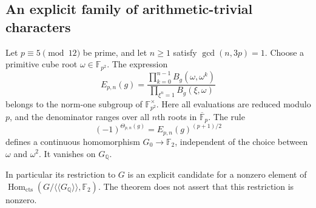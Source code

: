\subsection{An explicit family of arithmetic-trivial characters}

\begin{theorem}\label{thm:odd-anderson-character}
Let $p\equiv5\pmod{12}$ be prime, and let $n\geq1$ satisfy
$\gcd(n,3p)=1$.  Choose a primitive cube root
$\omega\in\mathbb F_{p^2}$.  The expression
\begin{equation}
 E_{p,n}(g)=
 \frac{\displaystyle\prod_{k=0}^{n-1}B_g(\omega,\omega^k)}
      {\displaystyle\prod_{\xi^n=1}B_g(\xi,\omega)}
 \label{eq:odd-anderson-defect}
\end{equation}
belongs to the norm-one subgroup of $\mathbb F_{p^2}^\times$.
Here all evaluations are reduced modulo $p$, and the denominator
ranges over all $n$th roots in $\overline{\mathbb F}_p$.
The rule
\begin{equation}
 (-1)^{\Theta_{p,n}(g)}=E_{p,n}(g)^{(p+1)/2}
 \label{eq:odd-anderson-sign}
\end{equation}
defines a continuous homomorphism $G_0\to\mathbb F_2$, independent
of the choice between $\omega$ and $\omega^2$.  It vanishes on
$G_{\mathbb Q}$.

In particular its restriction to $G$ is an explicit candidate for a
nonzero element of
$\operatorname{Hom}_{\mathrm{cts}}(G/\langle\!\langle
G_{\mathbb Q}\rangle\!\rangle,\mathbb F_2)$.
The theorem does not assert that this restriction is nonzero.
\end{theorem}

